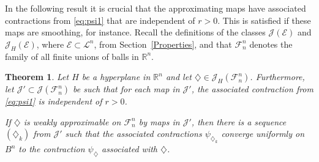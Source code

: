\documentclass[12pt,reqno]{amsart}
\newcommand{\R}{{\mathbb R}}
\newcommand{\cL}{\mathcal L}
\newcommand{\cF}{\mathcal F}
\newcommand{\cJ}{\mathcal J}
\newcommand{\cE}{{\mathcal E}}
\newtheorem{thm}{Theorem}[section]
\newcommand{\di}{\diamondsuit}
\numberwithin{equation}{section}
\begin{document}
In the following result it is crucial that the approximating maps have associated contractions from \eqref{eq:psi1} that are independent of $r>0$. This is satisfied if these maps are smoothing, for instance. Recall the definitions of the classes $\cJ(\cE)$ and $\cJ_H(\cE)$, where $\cE\subset {\cL}^n$, from Section~\ref{Properties}, and that $\cF_n^n$ denotes the family of all finite unions of balls in $\R^n$.

\begin{thm}\label{thm:not_weaklyfiniteBalls}
Let $H$ be a hyperplane in $\R^n$ and let $\di\in \cJ_H(\cF_n^n)$. Furthermore, let $\cJ'\subset \cJ(\cF_n^n)$ be such that for each map in $\cJ'$, the associated contraction from \eqref{eq:psi1} is independent of $r>0$.

If $\di$ is weakly approximable on ${\cF}_n^n$ by maps in $\cJ'$, then there is a sequence $(\di_k)$ from $\cJ'$ such that the associated contractions $\psi_{\di_k}$ converge uniformly on $B^n$ to the contraction $\psi_{\di}$ associated with $\di$.
\end{thm}
\end{document}
